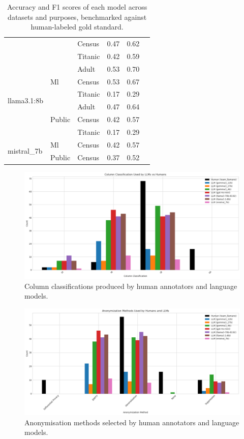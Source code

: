 \documentclass{article}
\begin{document}
\begin{table}[h!]
\begin{tabular}{lllccl}
 &  & Census & 0.47 & 0.62 \\
 &  & Titanic & 0.42 & 0.59 \\
\midrule
\multirow{6}{*}{llama3.1:8b} & \multirow{3}{*}{Ml} & Adult & 0.53 & 0.70 \\
 &  & Census & 0.53 & 0.67 \\
 &  & Titanic & 0.17 & 0.29 \\
 & \multirow{3}{*}{Public} & Adult & 0.47 & 0.64 \\
 &  & Census & 0.42 & 0.57 \\
 &  & Titanic & 0.17 & 0.29 \\
\midrule
\multirow{2}{*}{mistral\_7b} & Ml & Census & 0.42 & 0.57 \\
 & Public & Census & 0.37 & 0.52 \\
\bottomrule
\end{tabular}
\caption{Accuracy and F1 scores of each model across datasets and purposes, benchmarked against human-labeled gold standard.}
\label{tab:llm_eval_grouped}
\end{table}



\newpage

\begin{figure}[!htbp]
    \centering
    \includegraphics[width=\linewidth]{images/plot_eval2.png}
    \caption{Column classifications produced by human annotators and language models.}
    \label{fig:col}
\end{figure}

\begin{figure}[!htbp]
    \centering
    \includegraphics[width=\linewidth]{images/plot_eval.png}
    \caption{Anonymisation methods selected by human annotators and language models.}
    \label{fig:anonymization}
\end{figure}
\end{document}
